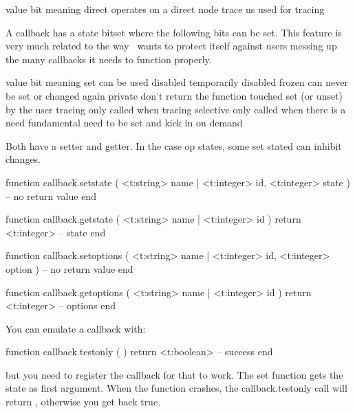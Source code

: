 \starttabulate[||||]
\FL
\NC value  \NC bit          \NC meaning \NC \NR
\ML
\NC direct \NC {} \NC operates on a direct node \NC \NR
\NC trace  \NC {} \NC us used for tracing \NC \NR
\LL
\stoptabulate

A callback has a state bitset where the following bits can be set. This feature
is very much related to the way \CONTEXT\ wants to protect itself against users
messing up the many callbacks it needs to function properly.

\starttabulate[||||]
\FL
\NC value       \NC bit          \NC meaning \NC \NR
\ML
\NC set         \NC {} \NC can be used \NC \NR
\NC disabled    \NC {} \NC temporarily disabled \NC \NR
\NC frozen      \NC {} \NC can never be set or changed again \NC \NR
\NC private     \NC {} \NC don't return the function \NC \NR
\NC touched     \NC {} \NC set (or unset) by the user \NC \NR
\NC tracing     \NC {} \NC only called when tracing \NC \NR
\NC selective   \NC {} \NC only called when there is a need \NC \NR
\NC fundamental \NC {} \NC need to be set and kick in on demand \NC \NR
\LL
\stoptabulate

Both have a setter and getter. In the case op states, some set stated can inhibit
changes.

\starttyping[option=LUA]
function callback.setstate (
    <t:string> name | <t:integer> id,
    <t:integer> state
)
    -- no return value
end

function callback.getstate (
    <t:string> name | <t:integer> id
)
    return <t:integer> -- state
end

function callback.setoptions (
    <t:string> name | <t:integer> id,
    <t:integer> option
)
    -- no return value
end

function callback.getoptions (
    <t:string> name | <t:integer> id
)
    return <t:integer> -- options
end
\stoptyping

You can emulate a callback with:

\starttyping[option=LUA]
function callback.testonly ( )
    return <t:boolean> -- success
end
\stoptyping

but you need to register the  callback for that to work. The set
function gets the state as first argument. When the function crashes, the \typ
{callback.testonly} call will return , otherwise you get back \type
{true}.


